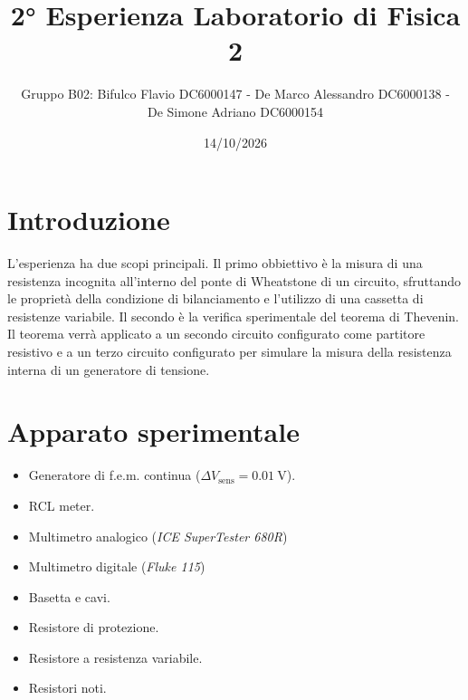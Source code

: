 \documentclass[12pt, a4paper]{article}
\title{2° Esperienza Laboratorio di Fisica 2} %
\author{Gruppo B02: Bifulco Flavio DC6000147 - De Marco Alessandro DC6000138 - \\ De Simone Adriano DC6000154}
\date{14/10/2026} %
\begin{document}
\maketitle
%
%

\section{Introduzione}
L'esperienza ha due scopi principali. Il primo obbiettivo è la misura di una resistenza incognita all'interno del ponte di Wheatstone di un circuito, sfruttando le proprietà della condizione di bilanciamento e l’utilizzo di una cassetta di resistenze variabile.
Il secondo è la verifica sperimentale del teorema di Thevenin. Il teorema verrà applicato a un secondo circuito configurato come partitore resistivo e a un terzo circuito configurato per simulare la misura della resistenza interna di un generatore di tensione.

\section{Apparato sperimentale}
\begin{itemize}[leftmargin=2cm]
    \item Generatore di f.e.m. continua (\(\Delta V_\text{sens} = \qty{0.01}{\volt}\)). 
    \item RCL meter.
    \item Multimetro analogico (\textit{ICE SuperTester 680R}) 
    \item Multimetro digitale (\textit{Fluke 115})
    \item Basetta e cavi.
    \item Resistore di protezione.
    \item Resistore a resistenza variabile.
    \item Resistori noti.
\end{itemize}
\end{document}
